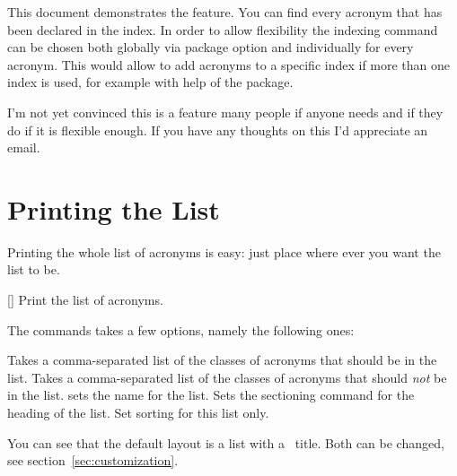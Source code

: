 \documentclass[load-preamble+,scrartcl={DIV10}]{cnltx-doc}
\begin{document}
This document demonstrates the feature.  You can find every acronym that has
been declared in the index.  In order to allow flexibility the indexing
command can be chosen both globally via package option and individually for
every acronym.  This would allow to add acronyms to a specific index if more
than one index is used, for example with help of the  package.

I'm not yet convinced this is a feature many people if anyone needs and if
they do if it is flexible enough.  If you have any thoughts on this I'd
appreciate an email.

\section{Printing the List}\label{sec:print_lists}
\noindent{}Printing the whole list of acronyms is easy: just
place  where ever you want the list to be.
\begin{commands}
  []
    Print the list of acronyms.
\end{commands}
The commands takes a few options, namely the following ones:
\begin{options}
    Takes a comma-separated list of the classes of acronyms that should be in
    the list.
    Takes a comma-separated list of the classes of acronyms that should
    \emph{not} be in the list.
    sets the name for the list.
    Sets the sectioning command for the heading of the
    list.
    Set sorting for this list only.
\end{options}
\begin{sourcecode}
  \printacronyms[exclude-classes=city]
 
  \printacronyms[include-classes=city,name={City Acronyms}]
\end{sourcecode}
\printacronyms[exclude-classes=city]

\printacronyms[include-classes=city,name={City Acronyms}]

You can see that the default layout is a  list with a
\sarg\ title.  Both can be changed, see
section~\ref{sec:customization}.
\end{document}

